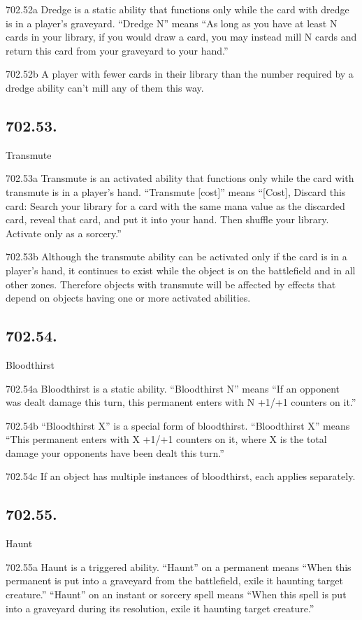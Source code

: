 702.52a Dredge is a static ability that functions only while the card with dredge is in a player’s graveyard. “Dredge N” means “As long as you have at least N cards in your library, if you would draw a card, you may instead mill N cards and return this card from your graveyard to your hand.”

702.52b A player with fewer cards in their library than the number required by a dredge ability can’t mill any of them this way.

\subsection*{702.53.}
Transmute

702.53a Transmute is an activated ability that functions only while the card with transmute is in a player’s hand. “Transmute [cost]” means “[Cost], Discard this card: Search your library for a card with the same mana value as the discarded card, reveal that card, and put it into your hand. Then shuffle your library. Activate only as a sorcery.”

702.53b Although the transmute ability can be activated only if the card is in a player’s hand, it continues to exist while the object is on the battlefield and in all other zones. Therefore objects with transmute will be affected by effects that depend on objects having one or more activated abilities.

\subsection*{702.54.}
Bloodthirst

702.54a Bloodthirst is a static ability. “Bloodthirst N” means “If an opponent was dealt damage this turn, this permanent enters with N +1/+1 counters on it.”

702.54b “Bloodthirst X” is a special form of bloodthirst. “Bloodthirst X” means “This permanent enters with X +1/+1 counters on it, where X is the total damage your opponents have been dealt this turn.”

702.54c If an object has multiple instances of bloodthirst, each applies separately.

\subsection*{702.55.}
Haunt

702.55a Haunt is a triggered ability. “Haunt” on a permanent means “When this permanent is put into a graveyard from the battlefield, exile it haunting target creature.” “Haunt” on an instant or sorcery spell means “When this spell is put into a graveyard during its resolution, exile it haunting target creature.”


